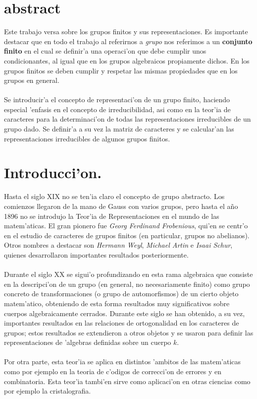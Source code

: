 \documentclass[a4paper,openright,12pt]{book}
\numberwithin{equation}{section} %
\begin{document}
\chapter*{abstract}
Este trabajo versa sobre los grupos finitos y sus representaciones. Es importante destacar que en todo el trabajo al referirnos a \textit{grupo} nos referimos a un  \textbf{conjunto finito} en el cual se definir'a una operaci'on que debe cumplir unos condicionantes, al igual que en los grupos algebraicos propiamente dichos. En los grupos finitos se deben cumplir y respetar las mismas propiedades que en los grupos en general.\\
\\
Se introducir'a el concepto de representaci'on de un grupo finito, haciendo especial 'enfasis en el concepto de irreducibilidad, asi como en la teor'ia de caracteres para la determinaci'on de todas las representaciones irreducibles de un grupo dado. Se definir'a a su vez la matriz de caracteres y se calcular'an las representaciones irreducibles de algunos grupos finitos. 

\tableofcontents
\chapter*{Introducci'on.}
Hasta el siglo XIX no se ten'ia claro el concepto de grupo abstracto. Los comienzos llegaron de la mano de Gauss con varios grupos, pero hasta el a\~no 1896 no se introdujo la Teor'ia de Representaciones en el mundo de las matem'aticas. El gran pionero fue \textit{Georg Ferdinand Frobenious}, qui'en se centr'o en el estudio de caracteres de grupos finitos (en particular, grupos no abelianos). Otros nombres a destacar son \textit{Hermann Weyl}, \textit{Michael Artin} e \textit{Isaai Schur}, quienes desarrollaron importantes resultados posteriormente.\\
\\
Durante el siglo XX se sigui'o profundizando en esta rama algebraica que consiste en la descripci'on de un grupo (en general, no necesariamente finito) como grupo concreto de transformaciones (o grupo de automorfismos) de un cierto objeto matem'atico, obteniendo de esta forma resultados muy significativos sobre cuerpos algebraicamente cerrados. Durante este siglo se han obtenido, a su vez, importantes resultados en las relaciones de ortogonalidad en los caracteres de grupos; estos resultados se extendieron a otros objetos y se usaron para definir las representaciones de 'algebras definidas sobre un cuerpo $k$.\\
\\
Por otra parte, esta teor'ia se aplica en distintos 'ambitos de las matem'aticas como por ejemplo en la teoria de c'odigos de correcci'on de errores y en combinatoria. Esta teor'ia tambi'en sirve como aplicaci'on en otras ciencias como por ejemplo la cristalografia.
\end{document}
